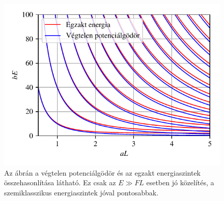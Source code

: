 	\begin{figure}[H]
		\centering
		\includegraphics[scale=1]{./figs/infsquareenergia.pdf}
		\caption[Végtelen potenciálgödör energiaszintjei]{Az ábrán a végtelen potenciálgödör és az egzakt energiaszintek összehasonlítása látható. Ez csak az $E \gg FL$ esetben jó közelítés, a szemiklasszikus energiaszintek jóval pontosabbak.}
	\end{figure}

